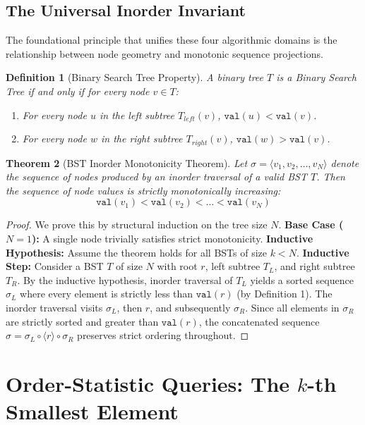 \documentclass[10pt,twocolumn,letterpaper]{article}
\newtheorem{theorem}{Theorem}
\newtheorem{definition}[theorem]{Definition}
\begin{document}
\subsection{The Universal Inorder Invariant}

The foundational principle that unifies these four algorithmic domains is the relationship between node geometry and monotonic sequence projections.

\begin{definition}[Binary Search Tree Property]
A binary tree $T$ is a Binary Search Tree if and only if for every node $v \in T$:
\begin{enumerate}
    \item For every node $u$ in the left subtree $T_{left}(v)$, $\texttt{val}(u) < \texttt{val}(v)$.
    \item For every node $w$ in the right subtree $T_{right}(v)$, $\texttt{val}(w) > \texttt{val}(v)$.
\end{enumerate}
\end{definition}

\begin{theorem}[BST Inorder Monotonicity Theorem]
Let $\sigma = \langle v_1, v_2, \dots, v_N \rangle$ denote the sequence of nodes produced by an inorder traversal of a valid BST $T$. Then the sequence of node values is strictly monotonically increasing:
\[
\texttt{val}(v_1) < \texttt{val}(v_2) < \dots < \texttt{val}(v_N)
\]
\end{theorem}

\begin{proof}
We prove this by structural induction on the tree size $N$. 
\textbf{Base Case ($N=1$):} A single node trivially satisfies strict monotonicity. 
\textbf{Inductive Hypothesis:} Assume the theorem holds for all BSTs of size $k < N$. 
\textbf{Inductive Step:} Consider a BST $T$ of size $N$ with root $r$, left subtree $T_L$, and right subtree $T_R$. By the inductive hypothesis, inorder traversal of $T_L$ yields a sorted sequence $\sigma_L$ where every element is strictly less than $\texttt{val}(r)$ (by Definition 1). The inorder traversal visits $\sigma_L$, then $r$, and subsequently $\sigma_R$. Since all elements in $\sigma_R$ are strictly sorted and greater than $\texttt{val}(r)$, the concatenated sequence $\sigma = \sigma_L \circ \langle r \rangle \circ \sigma_R$ preserves strict ordering throughout.
\end{proof}

\section{Order-Statistic Queries: The $k$-th Smallest Element}
\label{sec:kth-smallest}
\end{document}
